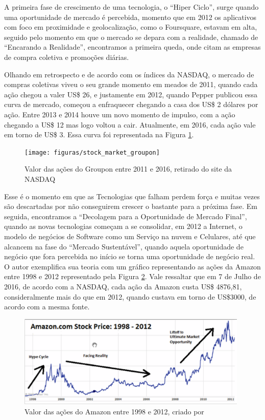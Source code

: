 A primeira fase de crescimento de uma tecnologia, o ``Hiper Ciclo'', surge quando uma oportunidade de mercado é percebida, momento que em 2012 os aplicativos com foco em proximidade e geolocalização, como o Foursquare, estavam em alta, seguido pelo momento em que o mercado se depara com a realidade, chamado de ``Encarando a Realidade'', encontramos a primeira queda, onde citam as empresas de compra coletiva e promoções diárias.

Olhando em retrospecto e de acordo com os índices da NASDAQ, o mercado de compras coletivas viveu o seu grande momento em meados de 2011, quando cada ação chegou a valer US\$ 26, e justamente em 2012, quando Pepper publicou essa curva de mercado, começou a enfraquecer chegando a casa dos US\$ 2 dólares por ação. Entre 2013 e 2014 houve um novo momento de impulso, com a ação chegando a US\$ 12 mas logo voltou a cair. Atualmente, em 2016, cada ação vale em torno de US\$ 3. Essa curva foi representada na Figura \ref{figure:stock_market_groupon}.

\begin{figure}[!htb]
\centering
\texttt{[image: figuras/stock\_market\_groupon]}
\caption{Valor das ações do Groupon entre 2011 e 2016, retirado do site da NASDAQ}
\label{figure:stock_market_groupon}
\end{figure}

Esse é o momento em que as Tecnologias que falham perdem força e muitas vezes são descartadas por não conseguirem crescer o bastante para a próxima fase. Em seguida, encontramos a ``Decolagem para a Oportunidade de Mercado Final'', quando as novas tecnologias começam a se consolidar, em 2012 a Internet, o modelo de negócios de Software como um Serviço na nuvem e Celulares, até que alcancem na fase do ``Mercado Sustentável'', quando aquela oportunidade de negócio que fora percebida no início se torna uma oportunidade de negócio real. O autor exemplifica sua teoria com um gráfico representando as ações da Amazon entre 1998 e 2012 representado pela Figura \ref{figure:stock_market_amazon}. Vale ressaltar que em 7 de Julho de 2016, de acordo com a NASDAQ, cada ação da Amazon custa US\$ 4876,81, consideralmente mais do que em 2012, quando custava em torno de US\$3000, de acordo com a mesma fonte.

\begin{figure}[!htb]
\centering
\includegraphics[width=11cm,angle=0]{figuras/stock_market_amazon}
\caption{Valor das ações do Amazon entre 1998 e 2012, criado por \cite{Pepper2012}}
\label{figure:stock_market_amazon}
\end{figure}

